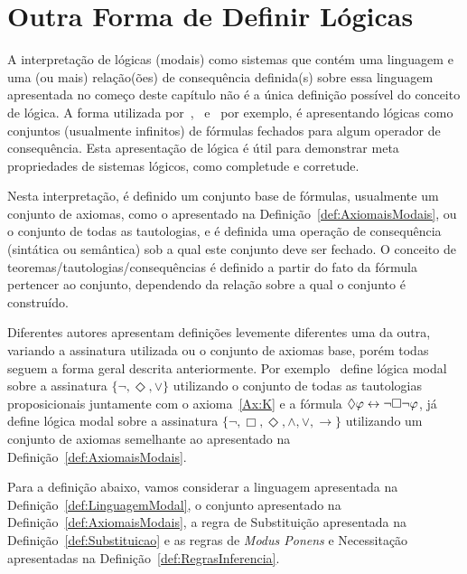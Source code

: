     \section{Outra Forma de Definir Lógicas}
        \label{sec:LM-LogicaComoConjunto}
        A interpretação de lógicas (modais) como sistemas que contém uma linguagem e uma (ou mais) relação(ões) de consequência definida(s) sobre essa linguagem
        apresentada no começo deste capítulo não é a única definição possível do conceito de lógica. A forma utilizada por~,~ e~
        por exemplo, é apresentando lógicas como conjuntos (usualmente infinitos) de fórmulas fechados para algum operador de consequência.
        Esta apresentação de lógica é útil para demonstrar meta propriedades de sistemas lógicos, como completude e corretude.

        Nesta interpretação, é definido um conjunto base de fórmulas, usualmente um conjunto de axiomas, como o apresentado na Definição~\ref{def:AxiomaisModais},
        ou o conjunto de todas as tautologias, e é definida uma operação de consequência (sintática ou semântica) sob a qual este conjunto deve ser fechado.
        O conceito de teoremas/tautologias/consequências é definido a partir do fato da fórmula pertencer ao conjunto, dependendo da relação sobre a qual o conjunto é construído.

        Diferentes autores apresentam definições levemente diferentes uma da outra, variando a assinatura utilizada ou o conjunto de axiomas base, porém todas
        seguem a forma geral descrita anteriormente. Por exemplo~ define lógica modal sobre a assinatura \(\{\neg, \Diamond, \lor\}\) utilizando
        o conjunto de todas as tautologias proposicionais juntamente com o axioma~\ref{Ax:K} e a fórmula \(\Diamond \varphi \leftrightarrow \neg \Box \neg \varphi\),
        já~ define lógica modal sobre a assinatura \(\{\neg, \Box, \Diamond, \land, \lor, \to\}\) utilizando um conjunto de axiomas
        semelhante ao apresentado na Definição~\ref{def:AxiomaisModais}.

        Para a definição abaixo, vamos considerar a linguagem \linguagem{} apresentada na Definição~\ref{def:LinguagemModal},
        o conjunto \LAMBDAlm apresentado na Definição~\ref{def:AxiomaisModais}, a regra de Substituição apresentada na Definição~\ref{def:Substituicao} e as
        regras de \textit{Modus Ponens} e Necessitação apresentadas na Definição~\ref{def:RegrasInferencia}.


